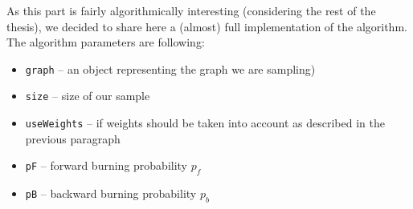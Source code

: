 As this part is fairly algorithmically interesting (considering the rest of the thesis), we decided to share here a (almost) full implementation of the algorithm. The algorithm parameters are following:

\begin{itemize}
\item \texttt{graph} -- an object representing the graph we are sampling)
\item \texttt{size} -- size of our sample
\item \texttt{useWeights} -- if weights should be taken into account as described in the previous paragraph
\item \texttt{pF} -- forward burning probability $p_f$ 
\item \texttt{pB} -- backward burning probability $p_b$
\end{itemize}

